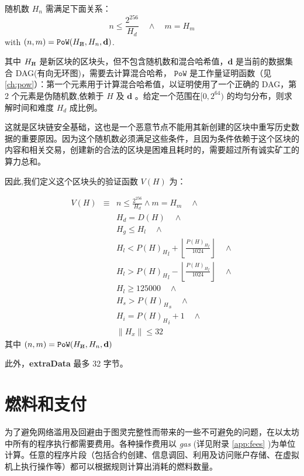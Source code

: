 \documentclass[9pt,oneside]{amsart}
\newcommand{\hcancel}[1]{%
    \tikz[baseline=(tocancel.base)]{
        \node[inner sep=0pt,outer sep=0pt] (tocancel) {#1};
        \draw[black] (tocancel.south west) -- (tocancel.north east);
    }%
}%
\begin{document}
\begin{multicols}{2}
随机数 $H_n$ 需满足下面关系：
\begin{equation}
n \leqslant \frac{2^{256}}{H_d} \quad \wedge \quad m = H_m
\end{equation}
with $(n, m) = \mathtt{PoW}(H_{\hcancel{n}}, H_n, \mathbf{d})$.

其中 $H_{\hcancel{n}}$ 是新区块的区块头，但不包含随机数和混合哈希值，$\mathbf{d}$  是当前的数据集合 DAG(有向无环图)，需要去计算混合哈希， $\mathtt{PoW}$ 是工作量证明函数（见 \ref{ch:pow}）：第一个元素用于计算混合哈希值，以证明使用了一个正确的 DAG，第 2 个元素是伪随机数,依赖于 $H$ 及 $\mathbf{d}$ 。给定一个范围在$[0, 2^{64})$ 的均匀分布，则求解时间和难度 $H_d$ 成比例。

这就是区块链安全基础，这也是一个恶意节点不能用其新创建的区块中重写历史数据的重要原因。因为这个随机数必须满足这些条件，且因为条件依赖于这个区块的内容和相关交易，创建新的合法的区块是困难且耗时的，需要超过所有诚实矿工的算力总和。

因此,我们定义这个区块头的验证函数 $V(H)$ 为：

\begin{eqnarray}
V(H) & \equiv &  n \leqslant \frac{2^{256}}{H_d} \wedge m = H_m \quad \wedge \\
& & H_d = D(H) \quad \wedge \\
& & H_g \le H_l  \quad \wedge \\
& & H_l < {P(H)_H}_l + \left\lfloor\frac{{P(H)_H}_l}{1024}\right\rfloor  \quad \wedge \\
& & H_l > {P(H)_H}_l - \left\lfloor\frac{{P(H)_H}_l}{1024}\right\rfloor  \quad \wedge \\
& & H_l \geqslant 125000  \quad \wedge \\
& & H_s > {P(H)_H}_s \quad \wedge \\
& & H_i = {P(H)_H}_i +1 \quad \wedge \\
& & \lVert H_x \rVert \le 32
\end{eqnarray}
其中 $(n, m) = \mathtt{PoW}(H_{\hcancel{n}}, H_n, \mathbf{d})$

此外，\textbf{extraData} 最多 32 字节。

\section{燃料和支付} \label{ch:payment}

为了避免网络滥用及回避由于图灵完整性而带来的一些不可避免的问题，在以太坊中所有的程序执行都需要费用。各种操作费用以 \textit{gas} (详见附录 \ref{app:fees} )为单位计算。任意的程序片段（包括合约创建、信息调回、利用及访问账户存储、在虚拟机上执行操作等）都可以根据规则计算出消耗的燃料数量。


\end{multicols}
\end{document}

